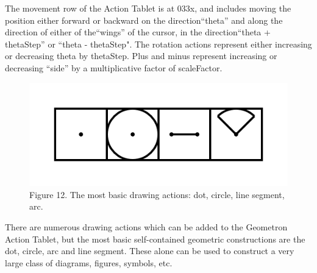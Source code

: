 \documentclass[11pt]{article}
\begin{document}
    The movement row of the Action Tablet is at 033x, and includes moving the position either forward or backward on the direction``theta'' and along the direction of either of the``wings'' of the cursor, in the direction``theta + thetaStep'' or ``theta - thetaStep".  The rotation actions represent either increasing or decreasing theta by thetaStep.  Plus and minus represent increasing or decreasing ``side'' by a multiplicative factor of scaleFactor.  


\begin{figure}

\includegraphics[width=\linewidth]{figures/figure12_basicDraw.png}

\caption{Figure 12. The most basic drawing actions: dot, circle, line segment, arc.}
\end{figure}




    There are numerous drawing actions which can be added to the Geometron Action Tablet, but the most basic self-contained geometric constructions are the dot, circle, arc and line segment.  These alone can be used to construct a very large class of diagrams, figures, symbols, etc.  
\end{document}
